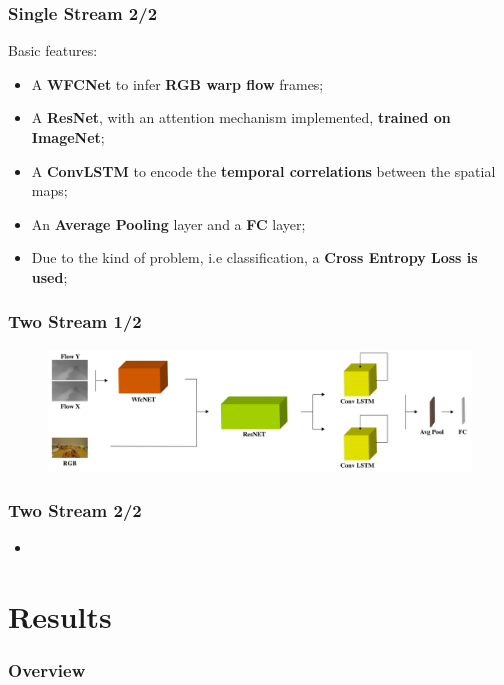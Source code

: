 \documentclass{beamer}
\begin{document}
\begin{frame}
\frametitle{Single Stream 2/2}

Basic features:
\begin{itemize}
\item A \textbf{WFCNet} to infer \textbf{RGB warp flow} frames;
\item A \textbf{ResNet}, with an attention mechanism implemented, \textbf{trained on ImageNet};
\item A \textbf{ConvLSTM} to encode the \textbf{temporal correlations} between the spatial maps; %
\item An \textbf{Average Pooling} layer and a \textbf{FC} layer;
\item Due to the kind of problem, i.e classification, a \textbf{Cross Entropy Loss is used};
\end{itemize}
 
\end{frame}

\begin{frame}
\frametitle{Two Stream 1/2}

\begin{figure}
\centering
\includegraphics[width=\textwidth]{../schemi/two_stream}
\end{figure}
 
\end{frame}

\begin{frame}
\frametitle{Two Stream 2/2}

\begin{itemize}
\item
\end{itemize}
 
\end{frame}
  
\section{Results}

\begin{frame}
\frametitle{Overview} 
	\tableofcontents[currentsection]
\end{frame}
     
\end{document}
